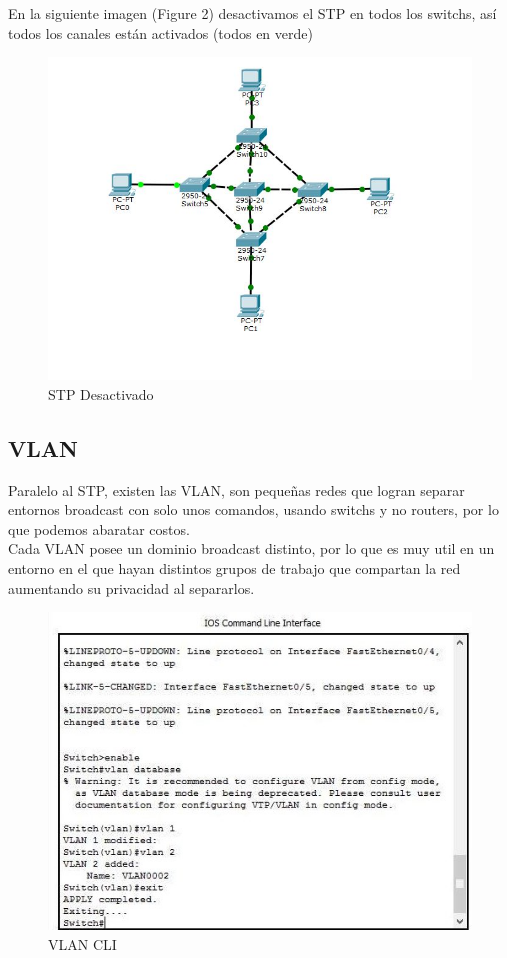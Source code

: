 \documentclass{article}
\begin{document}
En la siguiente imagen (Figure 2) desactivamos el STP en todos los switchs, así todos los canales están activados (todos en verde)
\newpage

\begin{figure}[h!]
\centering
\includegraphics[scale=0.7]{STPd}
\caption{STP Desactivado}
\end{figure}

\subsection{VLAN}

Paralelo al STP, existen las VLAN, son pequeñas redes que logran separar entornos broadcast con solo unos comandos, usando switchs y no routers, por lo que podemos abaratar costos.\\
Cada VLAN posee un dominio broadcast distinto, por lo que es muy util en un entorno en el que hayan distintos grupos de trabajo que compartan la red aumentando su privacidad al separarlos.

\begin{figure}[h!]
\centering
\includegraphics[scale=0.8]{vlan}
\caption{VLAN CLI}
\end{figure}
\end{document}
